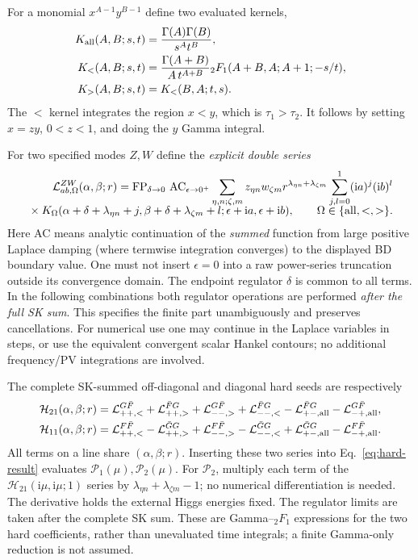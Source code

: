 \documentclass[a4paper,12pt]{article}
\newcommand{\ii}{\mathrm i}
\newcommand{\FP}{\operatorname{FP}}
\begin{document}
For a monomial $x^{A-1}y^{B-1}$ define two evaluated kernels,
\begin{align}
 K_{\rm all}(A,B;s,t)&=\frac{\Gamma(A)\Gamma(B)}{s^A t^B},\\
 K_{<}(A,B;s,t)&=\frac{\Gamma(A+B)}{A\,t^{A+B}}
 {}_2F_1(A+B,A;A+1;-s/t),\\
 K_{>}(A,B;s,t)&=K_{<}(B,A;t,s).
 \label{eq:Laplace}
\end{align}
The $<$ kernel integrates the region $x<y$, which is $\tau_1>\tau_2$.
It follows by setting $x=zy$, $0<z<1$, and doing the $y$ Gamma integral.

For two specified modes $Z,W$ define the \emph{explicit double series}
\begin{align}
 \mathcal L^{ZW}_{ab,\Omega}(\alpha,\beta;r)
 =\FP_{\delta\to0}\,\operatorname{AC}_{\epsilon\to0^+}
 \sum_{\eta,n;\zeta,m}z_{\eta n}w_{\zeta m}r^{\lambda_{\eta n}+\lambda_{\zeta m}}
 \sum_{j,l=0}^1(\ii a)^j(\ii b)^l\\[-2mm]
 {}\times K_{\Omega}(\alpha+\delta+\lambda_{\eta n}+j,
 \beta+\delta+\lambda_{\zeta m}+l;\epsilon+\ii a,\epsilon+\ii b),
 \qquad \Omega\in\{{\rm all},<,>\}.
 \label{eq:Lseries}
\end{align}
Here AC means analytic continuation of the \emph{summed} function from large
positive Laplace damping (where termwise integration converges) to the displayed
BD boundary value. One must not insert $\epsilon=0$ into a raw power-series
truncation outside its convergence domain. The endpoint regulator $\delta$ is
common to all terms. In the following combinations both regulator operations
are performed \emph{after the full SK sum}. This specifies the finite part
unambiguously and preserves cancellations. For numerical use one may continue
in the Laplace variables in steps, or use the equivalent convergent scalar
Hankel contours; no additional frequency/PV integrations are involved.

The complete SK-summed off-diagonal and diagonal hard seeds are respectively
\begin{align}
 \mathcal H_{21}(\alpha,\beta;r)={}&
 \mathcal L^{G\bar F}_{++,<}+\mathcal L^{\bar F G}_{++,>}
 +\mathcal L^{G\bar F}_{--,>}+\mathcal L^{\bar F G}_{--,<}
 -\mathcal L^{\bar F G}_{+-,\rm all}-\mathcal L^{G\bar F}_{-+,\rm all},\\
 \mathcal H_{11}(\alpha,\beta;r)={}&
 \mathcal L^{F\bar F}_{++,<}-\mathcal L^{\bar G G}_{++,>}
 +\mathcal L^{F\bar F}_{--,>}-\mathcal L^{\bar G G}_{--,<}
 +\mathcal L^{\bar G G}_{+-,\rm all}-\mathcal L^{F\bar F}_{-+,\rm all}.
 \label{eq:hard-series-combo}
\end{align}
All terms on a line share $(\alpha,\beta;r)$. Inserting these two series into
Eq.~\eqref{eq:hard-result} evaluates $\mathcal P_1(\mu),\mathcal P_2(\mu)$.
For $\mathcal P_2$, multiply each term of the
$\mathcal H_{21}(\ii\mu,\ii\mu;1)$ series by
$\lambda_{\eta n}+\lambda_{\zeta m}-1$; no numerical differentiation is needed.
The derivative holds the external Higgs energies fixed.
The regulator limits are taken after the complete SK sum. These are
Gamma--${}_2F_1$ expressions for the two hard coefficients, rather than
unevaluated time integrals; a finite Gamma-only reduction is not assumed.
\end{document}
